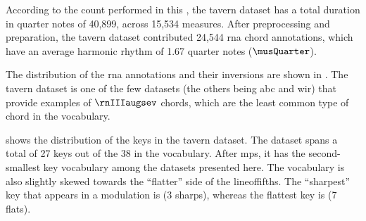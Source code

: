 
According to the count performed in this \thesisdiss{}, the
\gls{tavern} dataset has a total duration in quarter notes
of 40,899, across 15,534 measures. After preprocessing and
preparation, the \gls{tavern} dataset contributed 24,544
\gls{rna} chord annotations, which have an average harmonic
rhythm of 1.67 quarter notes ($\musQuarter$).

The distribution of the \gls{rna} annotations and their
inversions are shown in . The
\gls{tavern} dataset is one of the few datasets (the others
being \gls{abc} and \gls{wir}) that provide examples of
$\rnIIIaugsev$ chords, which are the least common type of
chord in the vocabulary.



 shows the distribution of the
keys in the \gls{tavern} dataset. The dataset spans a total
of 27 keys out of the 38 in the vocabulary. After \gls{mps},
it has the second-smallest key vocabulary among the datasets
presented here. The vocabulary is also slightly skewed
towards the ``flatter'' side of the \gls{lineoffifths}. The
``sharpest'' key that appears in a modulation is \keyfs{} (3
sharps), whereas the flattest key is \keyCb{} (7 flats).
